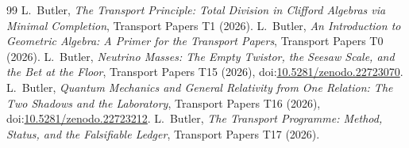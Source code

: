 \documentclass[11pt]{article}
\theoremstyle{definition}
\theoremstyle{plain}
\begin{document}
\begin{thebibliography}{99}
 L.~Butler,
\emph{The Transport Principle: Total Division in Clifford Algebras via Minimal Completion},
Transport Papers T1 (2026).
 L.~Butler,
\emph{An Introduction to Geometric Algebra: A Primer for the Transport Papers},
Transport Papers T0 (2026).
 L.~Butler,
\emph{Neutrino Masses: The Empty Twistor, the Seesaw Scale, and the Bet at the Floor},
Transport Papers T15 (2026), doi:\href{https://doi.org/10.5281/zenodo.22723070}{10.5281/zenodo.22723070}.
 L.~Butler,
\emph{Quantum Mechanics and General Relativity from One Relation: The Two Shadows and the Laboratory},
Transport Papers T16 (2026), doi:\href{https://doi.org/10.5281/zenodo.22723212}{10.5281/zenodo.22723212}.
 L.~Butler,
\emph{The Transport Programme: Method, Status, and the Falsifiable Ledger},
Transport Papers T17 (2026).
\end{thebibliography}
\end{document}
